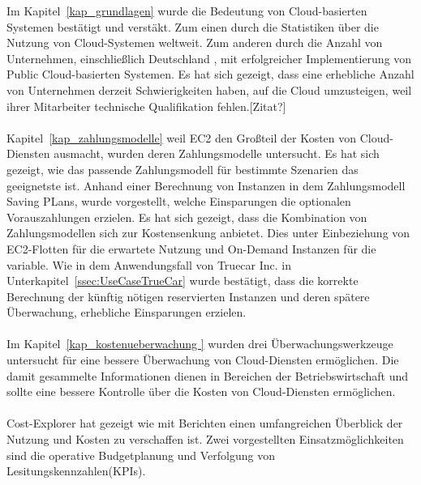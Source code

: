 Im Kapitel~\ref{kap_grundlagen} %
wurde die Bedeutung von Cloud-basierten Systemen bestätigt und verstäkt. Zum einen durch die Statistiken\cite{STA1,STA2,STA4} über die Nutzung von Cloud-Systemen weltweit. Zum anderen durch die Anzahl von Unternehmen, einschließlich Deutschland%
, mit erfolgreicher Implementierung von Public Cloud-basierten Systemen. Es hat sich gezeigt, dass eine erhebliche Anzahl von Unternehmen derzeit Schwierigkeiten haben, auf die Cloud umzusteigen, weil ihrer Mitarbeiter technische Qualifikation fehlen.[Zitat?] 
\\\\
Kapitel~\ref{kap_zahlungsmodelle} weil EC2 den Großteil der Kosten von Cloud-Diensten ausmacht, wurden deren Zahlungsmodelle untersucht. Es hat sich gezeigt, wie das passende Zahlungsmodell für bestimmte Szenarien das geeignetste ist. Anhand einer Berechnung von Instanzen in dem Zahlungsmodell Saving PLans, wurde vorgestellt, welche Einsparungen die optionalen Vorauszahlungen erzielen. Es hat sich gezeigt, dass die Kombination von Zahlungsmodellen sich zur Kostensenkung anbietet. Dies unter Einbeziehung von EC2-Flotten für die erwartete Nutzung und On-Demand Instanzen für die variable.%
%
Wie in dem Anwendungsfall von Truecar Inc. in Unterkapitel~\ref{ssec:UseCaseTrueCar} %
wurde bestätigt, dass die korrekte Berechnung der künftig nötigen reservierten Instanzen und deren spätere Überwachung, erhebliche Einsparungen erzielen.
\\\\
Im Kapitel~\ref{kap_kostenueberwachung } wurden drei Überwachungswerkzeuge untersucht für eine bessere Überwachung von Cloud-Diensten ermöglichen. Die damit gesammelte Informationen dienen in Bereichen der Betriebswirtschaft und sollte eine bessere Kontrolle über die Kosten von Cloud-Diensten ermöglichen.
\\\\
Cost-Explorer hat gezeigt wie mit Berichten einen umfangreichen Überblick der Nutzung und Kosten zu verschaffen ist. Zwei vorgestellten Einsatzmöglichkeiten sind die operative Budgetplanung und Verfolgung von Lesitungskennzahlen(KPIs).
